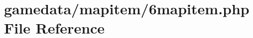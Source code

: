 \hypertarget{6mapitem_8php}{\section{gamedata/mapitem/6mapitem.php File Reference}
\label{6mapitem_8php}
}
